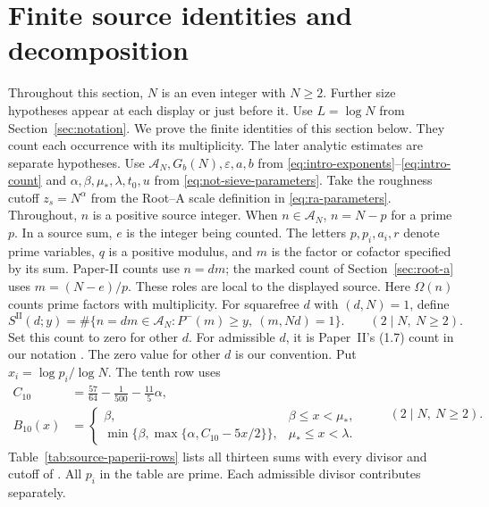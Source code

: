 \section{Finite source identities and decomposition}
\label{sec:source-decomposition}

Throughout this section, \(N\) is an even integer with \(N\ge2\).
Further size hypotheses appear at each display or just before it.
Use \(L=\log N\) from Section~\ref{sec:notation}.
We prove the finite identities of this section below.
They count each occurrence with its multiplicity.
The later analytic estimates are separate hypotheses.
Use \(\mathcal A_N,G_b(N),\varepsilon,a,b\) from
\eqref{eq:intro-exponents}--\eqref{eq:intro-count} and
\(\alpha,\beta,\mu_*,\lambda,t_0,u\) from
\eqref{eq:not-sieve-parameters}. Take the roughness cutoff
\(z_s=N^\alpha\) from the Root--A scale definition in
\eqref{eq:ra-parameters}.
Throughout, \(n\) is a positive source integer. When
\(n\in\mathcal A_N\), \(n=N-p\) for a prime \(p\). In a source sum, \(e\)
is the integer being counted. The letters \(p,p_i,a_i,r\) denote
prime variables, \(q\) is a positive modulus, and \(m\) is the factor or
cofactor specified by its sum. Paper-II counts use
\(n=dm\); the marked count of Section~\ref{sec:root-a} uses \(m=(N-e)/p\). These roles
are local to the displayed source.
Here \(\Omega(n)\) counts prime factors with multiplicity.
For squarefree \(d\) with \((d,N)=1\), define
\begin{equation}\label{eq:source-paperii-cofactor}
 S^{\mathrm{II}}(d;y)
 =\#\{n=dm\in\mathcal A_N:P^-(m)\ge y,\ (m,Nd)=1\}.
\qquad(2\mid N,\ N\ge2).
\end{equation}
Set this count to zero for other \(d\).
For admissible \(d\), it is Paper~II's (1.7) count in our notation
\cite[(1.7)]{PaperII}. The zero value for other \(d\) is our convention.
Put \(x_i=\log p_i/\log N\).
The tenth row uses
\begin{equation}\label{eq:source-paperii-clipping}
\begin{aligned}
 C_{10}&=\frac{57}{64}-\frac1{500}-\frac{11}{5}\alpha,\\
 B_{10}(x)&=\begin{cases}
 \beta,&\beta\le x<\mu_*,\\
 \min\{\beta,\max\{\alpha,C_{10}-5x/2\}\},
     &\mu_*\le x<\lambda.
 \end{cases}
\end{aligned}
\qquad(2\mid N,\ N\ge2).
\end{equation}
Table~\ref{tab:source-paperii-rows} lists all thirteen sums with every
divisor and cutoff of \cite[(1.6)--(1.7), row table]{PaperII}.
All \(p_i\) in the table are prime.
Each admissible divisor contributes separately.

